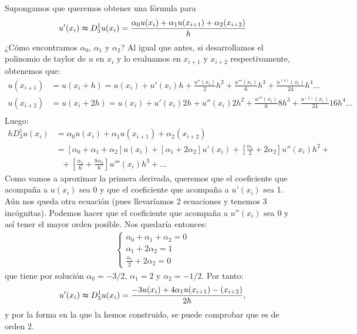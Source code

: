 Supongamos que queremos obtener una fórmula para
\begin{align*}
    u'(x_i) \thickapprox D_3^1u(x_i) = \frac{\alpha_0u(x_i) + \alpha_1u(x_{i+1}) + \alpha_2(x_{i+2})}{h}
\end{align*}
¿Cómo encontramos $\alpha_0$, $\alpha_1$ y $\alpha_2$? Al igual que antes, si desarrollamos el polinomio de taylor de $u$ en $x_i$ y lo evaluamos en $x_{i+1}$ y $x_{i+2}$ respectivamente, obtenemos que:
\begin{align*}
    u(x_{i+1}) & = u(x_i + h) =  u(x_i) + u'(x_i)h + \frac{u''(x_i)}{2}h^2 + \frac{u'''(x_i)}{6}h^3 + \frac{u^{(4)}(x_i)}{24}h^4\ldots \\
    u(x_{i+2}) & = u(x_i + 2h) =  u(x_i) + u'(x_i)2h + u''(x_i)2h^2 + \frac{u'''(x_i)}{6}8h^3 + \frac{u^{(4)}(x_i)}{24}16h^4\ldots     \\
\end{align*}
Luego:
\begin{align*}
    hD_3^1u(x_i) & = \alpha_0u(x_i) + \alpha_1u(x_{i+1}) + \alpha_2(x_{i+2})                                                                             \\
                 & = [\alpha_0 + \alpha_1 + \alpha_2]u(x_i) + [\alpha_1 + 2\alpha_2]u'(x_i) + \left[ \frac{\alpha_1}{2} + 2\alpha_2 \right]u''(x_i)h^2 + \\
                 & \ \ \ + \left[ \frac{\alpha_1}{6} + \frac{8\alpha_2}{6} \right]u'''(x_i)h^3 + \ldots
\end{align*}
Como vamos a aproximar la primera derivada, queremos que el coeficiente que acompaña a $u(x_i)$ sea 0 y que el coeficiente que acompaña a $u'(x_i)$ sea 1. Aún nos queda otra ecuación (pues llevaríamos 2 ecuaciones y tenemos 3 incógnitas). Podemos hacer que el coeficiente que acompaña a $u''(x_i)$ sea 0 y así tener el mayor orden posible. Nos quedaría entonces:
\begin{align*}
    \left\{ \begin{array}{lcc}
                \alpha_0 + \alpha_1 + \alpha_2 = 0 \\
                \alpha_1 + 2\alpha_2 = 1           \\
                \frac{\alpha_1}{2} + 2\alpha_2 = 0
            \end{array}
    \right.
\end{align*}
que tiene por solución $\alpha_0 = -3/2$, $\alpha_1 = 2$ y $\alpha_2 = -1/2$. Por tanto:
\begin{align*}
    u'(x_i) \thickapprox D_3^1u(x_i) = \frac{-3u(x_i) + 4\alpha_1u(x_{i+1}) -(x_{i+2})}{2h},
\end{align*}
y por la forma en la que la hemos construido, se puede comprobar que es de orden 2.

